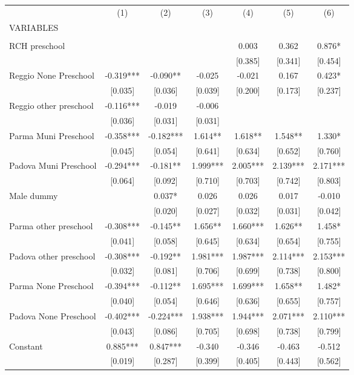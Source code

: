 \begin{tabular}{lcccccc} \hline
 & (1) & (2) & (3) & (4) & (5) & (6) \\
VARIABLES &  &  &  &  &  &  \\ \hline
 &  &  &  &  &  &  \\
RCH preschool &  &  &  & 0.003 & 0.362 & 0.876* \\
 &  &  &  & [0.385] & [0.341] & [0.454] \\
Reggio None Preschool & -0.319*** & -0.090** & -0.025 & -0.021 & 0.167 & 0.423* \\
 & [0.035] & [0.036] & [0.039] & [0.200] & [0.173] & [0.237] \\
Reggio other preschool & -0.116*** & -0.019 & -0.006 &  &  &  \\
 & [0.036] & [0.031] & [0.031] &  &  &  \\
Parma Muni Preschool & -0.358*** & -0.182*** & 1.614** & 1.618** & 1.548** & 1.330* \\
 & [0.045] & [0.054] & [0.641] & [0.634] & [0.652] & [0.760] \\
Padova Muni Preschool & -0.294*** & -0.181** & 1.999*** & 2.005*** & 2.139*** & 2.171*** \\
 & [0.064] & [0.092] & [0.710] & [0.703] & [0.742] & [0.803] \\
Male dummy &  & 0.037* & 0.026 & 0.026 & 0.017 & -0.010 \\
 &  & [0.020] & [0.027] & [0.032] & [0.031] & [0.042] \\
Parma other preschool & -0.308*** & -0.145** & 1.656** & 1.660*** & 1.626** & 1.458* \\
 & [0.041] & [0.058] & [0.645] & [0.634] & [0.654] & [0.755] \\
Padova other preschool & -0.308*** & -0.192** & 1.981*** & 1.987*** & 2.114*** & 2.153*** \\
 & [0.032] & [0.081] & [0.706] & [0.699] & [0.738] & [0.800] \\
Parma None Preschool & -0.394*** & -0.112** & 1.695*** & 1.699*** & 1.658** & 1.482* \\
 & [0.040] & [0.054] & [0.646] & [0.636] & [0.655] & [0.757] \\
Padova None Preschool & -0.402*** & -0.224*** & 1.938*** & 1.944*** & 2.071*** & 2.110*** \\
 & [0.043] & [0.086] & [0.705] & [0.698] & [0.738] & [0.799] \\
Constant & 0.885*** & 0.847*** & -0.340 & -0.346 & -0.463 & -0.512 \\
 & [0.019] & [0.287] & [0.399] & [0.405] & [0.443] & [0.562] \\

\end{tabular}
